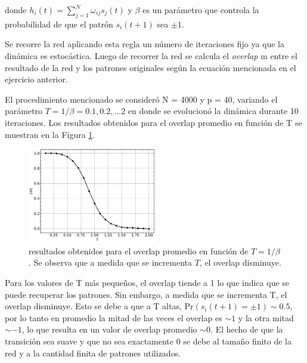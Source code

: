 \documentclass[11pt, twocolumn]{article}
\begin{document}
\noindent donde \(h_i(t) = \sum_{j=1}^{N} \omega_{ij} s_j(t)\) y \(\beta\) es un parámetro que controla la probabilidad de que el patrón \(s_i(t+1)\) sea \(\pm 1\). 

Se recorre la red aplicando esta regla un número de iteraciones fijo ya que la dinámica es estocástica. Luego de recorrer la red se calcula el \textit{overlap} m entre el resultado de la red y los patrones originales según la ecuación mencionada en el ejercicio anterior.

El procedimiento mencionado se consideró N = 4000 y p = 40, variando el parámetro \(T = 1/ \beta = 0.1, 0.2, \ldots 2\) en donde se evolucionó la dinámica durante 10 iteraciones. Los resultados obtenidos para el overlap promedio en función de T se muestran en la Figura \ref{fig:ej2}.

\begin{figure} [htbp]
    \centering
    \includegraphics[width=0.5\textwidth]{figures/overlaps_ej_2.pdf}
    \caption{resultados obtenidos para el overlap promedio en función de \(T = 1/\beta\). Se observa que a medida que se incrementa \(T\), el overlap disminuye.}
    \label{fig:ej2}
\end{figure}

Para los valores de T más pequeños, el overlap tiende a 1 lo que indica que se puede recuperar los patrones. Sin embargo, a medida que se incrementa T, el overlap disminuye. Esto se debe a que a T altas, \(\text{Pr} (s_i(t+1) = \pm 1) \sim 0.5\), por lo tanto en promedio la mitad de las veces el overlap es \(\sim 1\) y la otra mitad \(\sim -1\), lo que resulta en un valor de overlap promedio \(\sim 0\). El hecho de que la transición sea suave y que no sea exactamente 0 se debe al tamaño finito de la red y a la cantidad finita de patrones utilizados.
\end{document}
